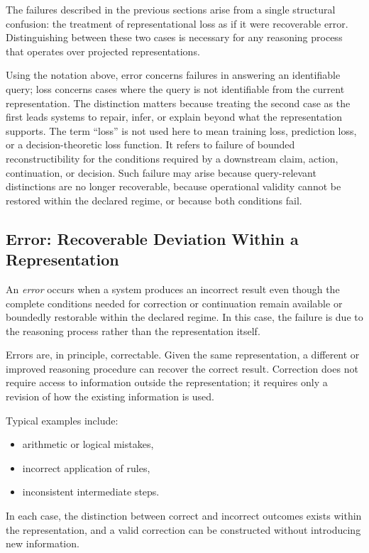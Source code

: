 \documentclass[11pt]{article}
\begin{document}
The failures described in the previous sections arise from a single structural confusion: the treatment of representational loss as if it were recoverable error. Distinguishing between these two cases is necessary for any reasoning process that operates over projected representations.

Using the notation above, error concerns failures in answering an identifiable query; loss concerns cases where the query is not identifiable from the current representation. The distinction matters because treating the second case as the first leads systems to repair, infer, or explain beyond what the representation supports. The term ``loss'' is not used here to mean training loss, prediction loss, or a decision-theoretic loss function. It refers to failure of bounded reconstructibility for the conditions required by a downstream claim, action, continuation, or decision. Such failure may arise because query-relevant distinctions are no longer recoverable, because operational validity cannot be restored within the declared regime, or because both conditions fail.

\subsection{Error: Recoverable Deviation Within a Representation}

An \emph{error} occurs when a system produces an incorrect result even though the complete conditions needed for correction or continuation remain available or boundedly restorable within the declared regime. In this case, the failure is due to the reasoning process rather than the representation itself.

Errors are, in principle, correctable. Given the same representation, a different or improved reasoning procedure can recover the correct result. Correction does not require access to information outside the representation; it requires only a revision of how the existing information is used.

Typical examples include:
\begin{itemize}[leftmargin=1.5em]
    \item arithmetic or logical mistakes,
    \item incorrect application of rules,
    \item inconsistent intermediate steps.
\end{itemize}

In each case, the distinction between correct and incorrect outcomes exists within the representation, and a valid correction can be constructed without introducing new information.
\end{document}
